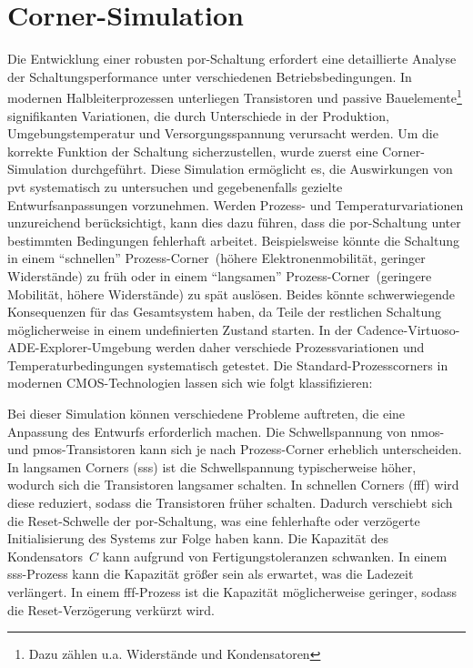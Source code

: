 \section{Corner-Simulation}
Die Entwicklung einer robusten \gls{por}-Schaltung erfordert eine detaillierte Analyse der Schaltungsperformance unter verschiedenen Betriebsbedingungen. In modernen Halbleiterprozessen unterliegen Transistoren und passive Bauelemente\footnote{Dazu zählen u.a. Widerstände und Kondensatoren} signifikanten Variationen, die durch Unterschiede in der Produktion, Umgebungstemperatur und Versorgungsspannung verursacht werden. Um die korrekte Funktion der Schaltung sicherzustellen, wurde zuerst eine Corner-Simulation durchgeführt. Diese Simulation ermöglicht es, die Auswirkungen von \gls{pvt} systematisch zu untersuchen und gegebenenfalls gezielte Entwurfsanpassungen vorzunehmen. Werden Prozess- und Temperaturvariationen unzureichend berücksichtigt, kann dies dazu führen, dass die \gls{por}-Schaltung unter bestimmten Bedingungen fehlerhaft arbeitet. Beispielsweise könnte die Schaltung in einem \enquote{schnellen} Prozess-Corner~(höhere Elektronenmobilität, geringer Widerstände) zu früh oder in einem \enquote{langsamen} Prozess-Corner~(geringere Mobilität, höhere Widerstände) zu spät auslösen. Beides könnte schwerwiegende Konsequenzen für das Gesamtsystem haben, da Teile der restlichen Schaltung möglicherweise in einem undefinierten Zustand starten. In der Cadence-Virtuoso-ADE-Explorer-Umgebung werden daher verschiede Prozessvariationen und Temperaturbedingungen systematisch getestet. Die Standard-Prozesscorners in modernen CMOS-Technologien lassen sich wie folgt klassifizieren: 


Bei dieser Simulation können verschiedene Probleme auftreten, die eine Anpassung des Entwurfs erforderlich machen. Die Schwellspannung von \gls{nmos}- und \gls{pmos}-Transistoren kann sich je nach Prozess-Corner erheblich unterscheiden. In langsamen Corners (sss) ist die Schwellspannung typischerweise höher, wodurch sich die Transistoren langsamer schalten. In schnellen Corners (fff) wird diese reduziert, sodass die Transistoren früher schalten. Dadurch verschiebt sich die Reset-Schwelle der \gls{por}-Schaltung, was eine fehlerhafte oder verzögerte Initialisierung des Systems zur Folge haben kann. Die Kapazität des Kondensators~$C$ kann aufgrund von Fertigungstoleranzen schwanken. In einem sss-Prozess kann die Kapazität größer sein als erwartet, was die Ladezeit verlängert. In einem fff-Prozess ist die Kapazität möglicherweise geringer, sodass die Reset-Verzögerung verkürzt wird. 

